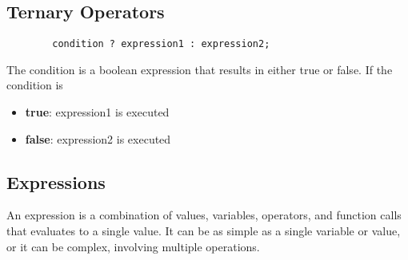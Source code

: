 \documentclass[11pt,A4]{article}
\begin{document}
        \subsection{Ternary Operators}
        \begin{lstlisting}
        condition ? expression1 : expression2;
        \end{lstlisting}
        The condition is a boolean expression that results in either true or false. If the condition is 
        \begin{itemize}
            \item \textbf{true}: expression1 is executed
            \item \textbf{false}: expression2 is executed
        \end{itemize}

        \subsection{Expressions}
        An expression is a combination of values, variables, operators, and function calls that evaluates to a single value. It can be as simple as a single variable or value, or it can be complex, involving multiple operations. \\
\end{document}
